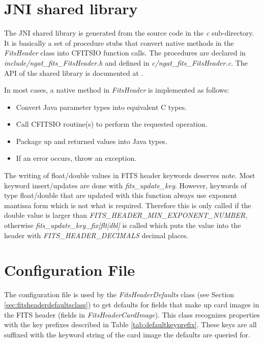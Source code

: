 \documentclass[10pt,a4paper]{article}
\begin{document}
\section{JNI shared library}
The JNI shared library is generated from the source code in the {\em c} sub-directory. It is basically a 
set of procedure stubs that convert native methods in the {\em FitsHeader} class into CFITSIO function calls.
The procedures are declared in {\em include/ngat\_fits\_FitsHeader.h} and defined in {\em c/ngat\_fits\_FitsHeader.c}.
The API of the shared library is documented at \cite{bib:ngatfitsjniapi}.

In most cases, a native method in {\em FitsHeader} is implemented as follows:
\begin{itemize}
\item Convert Java parameter types into equivalent C types.
\item Call CFITSIO routine(s) to perform the requested operation.
\item Package up and returned values into Java types.
\item If an error occurs, throw an exception.
\end{itemize}

The writing of float/double values in FITS header keywords deserves note. Most keyword insert/updates are done
with {\em fits\_update\_key}. However, keywords of type float/double that are updated with this function
always use exponent mantissa form which is not what is required. Therefore this is only called if
the double value is larger than {\em FITS\_HEADER\_MIN\_EXPONENT\_NUMBER}, otherwise 
{\em fits\_update\_key\_fix[flt|dbl]} is called which puts the value into the header with {\em FITS\_HEADER\_DECIMALS}
decimal places.

\section{Configuration File}
\label{sec:configfile}
The configuration file is used by the {\em FitsHeaderDefaults} class (see Section \ref{sec:fitsheaderdefaultsclass}) 
to get defaults for fields that make up card images in the FITS header (fields in {\em FitsHeaderCardImage}).
This class recognizes properties with the key prefixes described in Table \ref{tab:defaultkeyprefix}.
These keys are all suffixed with the keyword string of the card image the defaults are queried for.
\end{document}
